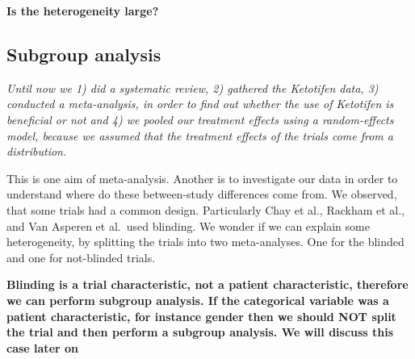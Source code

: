 \documentclass[]{article}
\begin{document}
\newline 

\newline 

\newline 

\newline 

\newline 

\newline 

\textbf{Is the heterogeneity large?}

\newline 

\newline 

\newline 

\newline 

\newline 

\newline 

\newpage

\hypertarget{subgroup-analysis}{%
\subsection{Subgroup analysis}\label{subgroup-analysis}}

\emph{Until now we 1) did a systematic review, 2) gathered the Ketotifen
data, 3) conducted a meta-analysis, in order to find out whether the use
of Ketotifen is beneficial or not and 4) we pooled our treatment effects
using a random-effects model, because we assumed that the treatment
effects of the trials come from a distribution.}

This is one aim of meta-analysis. Another is to investigate our data in
order to understand where do these between-study differences come from.
We observed, that some trials had a common design. Particularly Chay et
al., Rackham et al., and Van Asperen et al.~used blinding. We wonder if
we can explain some heterogeneity, by splitting the trials into two
meta-analyses. One for the blinded and one for not-blinded trials.

\textbf{Blinding is a trial characteristic, not a patient
characteristic, therefore we can perform subgroup analysis. If the
categorical variable was a patient characteristic, for instance gender
then we should NOT split the trial and then perform a subgroup analysis.
We will discuss this case later on}
\end{document}
